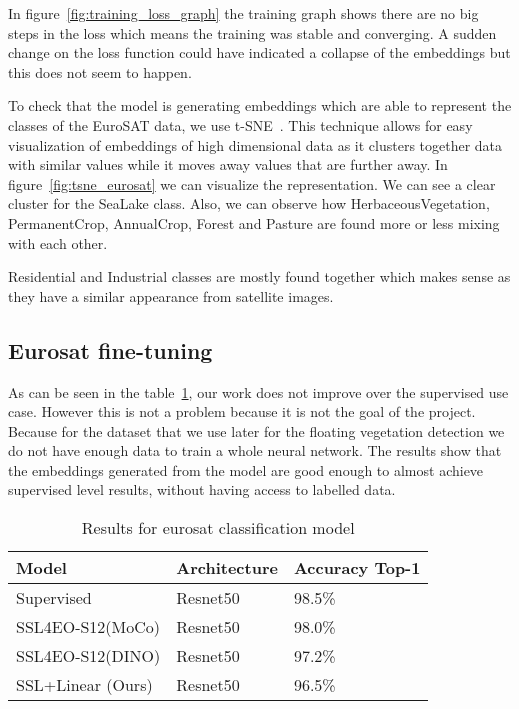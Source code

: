 \documentclass[conference]{IEEEtran}
\begin{document}
    In figure~\ref{fig:training_loss_graph} the training graph shows there are no big steps in the loss which means the training was stable and converging.
    A sudden change on the loss function could have indicated a collapse of the embeddings but this does not seem to happen.

    To check that the model is generating embeddings which are able to represent the classes of the EuroSAT data, we use t-SNE~\cite{JMLR:v9:vandermaaten08a}.
    This technique allows for easy visualization of embeddings of high dimensional data as it clusters together data with similar values while it moves away
    values that are further away.
    In figure~\ref{fig:tsne_eurosat} we can visualize the representation.
    We can see a clear cluster for the SeaLake class.
    Also, we can observe how HerbaceousVegetation, PermanentCrop, AnnualCrop, Forest and Pasture are found more or less mixing with each other.

    Residential and Industrial classes are mostly found together which makes sense as they have a similar appearance from satellite images.

    \subsection{Eurosat fine-tuning}

    As can be seen in the table~\ref{table:eurosat_results}, our work does not improve over the supervised use case.
    However this is not a problem because it is not the goal of the project.
    Because for the dataset that we use later for the floating vegetation detection we do not have enough data to train a whole neural network.
    The results show that the embeddings generated from the model are good enough to almost achieve supervised level results,
    without having access to labelled data.


    \begin{table}[h!]
        \centering
        \begin{tabular}{ |p{3cm}||p{2cm}|p{2cm}|}
            \hline
            Model                                    & Architecture & Accuracy Top-1 \\
            \hline
            \hline
            Supervised                               & Resnet50     & 98.5\%         \\
            SSL4EO-S12(MoCo)\cite{wang2023ssl4eos12} & Resnet50     & 98.0\%         \\
            SSL4EO-S12(DINO)\cite{wang2023ssl4eos12} & Resnet50     & 97.2\%         \\
            SSL+Linear (Ours)                        & Resnet50     & 96.5\%         \\
            \hline
        \end{tabular}
        \caption{Results for eurosat classification model}
        \label{table:eurosat_results}
    \end{table}
\end{document}
